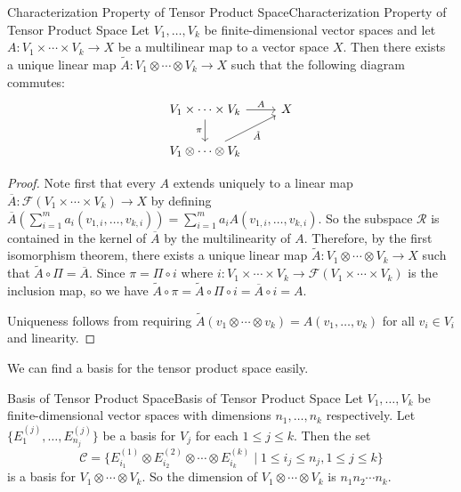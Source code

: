 \documentclass[../main.tex]{subfiles}
\begin{document}
\begin{proposition}{Characterization Property of Tensor Product Space}{Characterization Property of Tensor Product Space}
  Let $V_1, \ldots, V_k$ be finite-dimensional vector spaces and let $A: V_1 \times \cdots \times V_k \to X$ be a multilinear map to a vector space $X$. Then there exists a unique linear map $\tilde{A}: V_1 \otimes \cdots \otimes V_k \to X$ such that the following diagram commutes:
  \begin{equation*}
    \begin{tikzcd}
      V_1 \times \cdots \times V_k \arrow[r, "A"] \arrow[d, "\pi"'] & X \\
      V_1 \otimes \cdots \otimes V_k \arrow[ur, "\tilde{A}"']
    \end{tikzcd}
  \end{equation*}
\end{proposition}
\begin{proof}
  Note first that every $A$ extends uniquely to a linear map $\overline{A}: \mathcal{F}(V_1 \times \cdots \times V_k) \to X$ by defining $\overline{A}(\sum_{i = 1}^m a_i (v_{1,i}, \ldots, v_{k,i})) = \sum_{i = 1}^m a_i A(v_{1,i}, \ldots, v_{k,i})$. So the subspace $\mathcal{R}$ is contained in the kernel of $\overline{A}$ by the multilinearity of $A$. Therefore, by the first isomorphism theorem, there exists a unique linear map $\tilde{A}: V_1 \otimes \cdots \otimes V_k \to X$ such that $\tilde{A} \circ \Pi = \overline{A}$. Since $\pi = \Pi \circ i$ where $i: V_1 \times \cdots \times V_k \to \mathcal{F}(V_1 \times \cdots \times V_k)$ is the inclusion map, so we have $\tilde{A} \circ \pi = \tilde{A} \circ \Pi \circ i = \overline{A} \circ i = A$.

  Uniqueness follows from requiring $\tilde{A}(v_1 \otimes \cdots \otimes v_k) = A(v_1, \ldots, v_k)$ for all $v_i \in V_i$ and linearity.
\end{proof}

We can find a basis for the tensor product space easily.
\begin{proposition}{Basis of Tensor Product Space}{Basis of Tensor Product Space}
  Let $V_1, \ldots, V_k$ be finite-dimensional vector spaces with dimensions $n_1, \ldots, n_k$ respectively. Let $\{E_1^{(j)}, \ldots, E_{n_j}^{(j)}\}$ be a basis for $V_j$ for each $1 \leq j \leq k$. Then the set
  \begin{equation*}
    \mathcal{C} = \{E_{i_1}^{(1)} \otimes E_{i_2}^{(2)} \otimes \cdots \otimes E_{i_k}^{(k)} \mid 1 \leq i_j \leq n_j, 1 \leq j \leq k\}
  \end{equation*}
  is a basis for $V_1 \otimes \cdots \otimes V_k$. So the dimension of $V_1 \otimes \cdots \otimes V_k$ is $n_1 n_2 \cdots n_k$.
\end{proposition}
\end{document}
